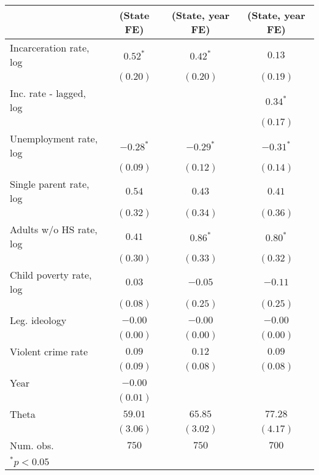 
\begin{table}
\tiny
\begin{center}
\label{CL-Rob}
\begin{tabular}{l c c c}
\hline
&(State FE)&(State, year FE)&(State, year FE)\\
\hline
Incarceration rate, log     & $0.52^{*}$  &$0.42^{*}$      &$0.13$ \\
                            & $(0.20)$    & $(0.20)$       &$(0.19)$\\
Inc. rate - lagged, log     &             &                &$0.34^{*}$\\
                            &             &                &$(0.17)$\\
Unemployment rate, log      & $-0.28^{*}$ &$-0.29^{*}$     &$-0.31^{*}$\\
                            & $(0.09)$    & $(0.12)$       &$(0.14)$\\
Single parent rate, log     & $0.54$      & $0.43$         &$0.41$\\
                            & $(0.32)$    & $(0.34)$       &$(0.36)$\\
Adults w/o HS rate, log     & $0.41$      & $0.86^{*}$     &$0.80^{*}$\\
                            & $(0.30)$    & $(0.33)$       &$(0.32)$\\
Child poverty rate, log     & $0.03$      &  $-0.05$       &$-0.11$\\
                            & $(0.08)$    &  $(0.25)$      &$(0.25)$\\
Leg. ideology               & $-0.00$     & $-0.00$        &$-0.00$\\
                            & $(0.00)$    & $(0.00)$       &$(0.00)$\\
Violent crime rate          & $0.09$      & $0.12$         &$0.09$\\
                            & $(0.09)$    & $(0.08)$       &$(0.08)$\\
Year                        & $-0.00$     &                & \\
                            & $(0.01)$    &                & \\
Theta                       & $59.01$     & $65.85$        &$77.28$\\
                            & $(3.06)$      & $(3.02)$       &$(4.17)$\\
\hline
Num. obs.                   & $750$         & $750$          &$700$\\
\hline
\multicolumn{3}{l}{\scriptsize{$^*p<0.05$}}
\end{tabular}
\end{center}
\end{table}
